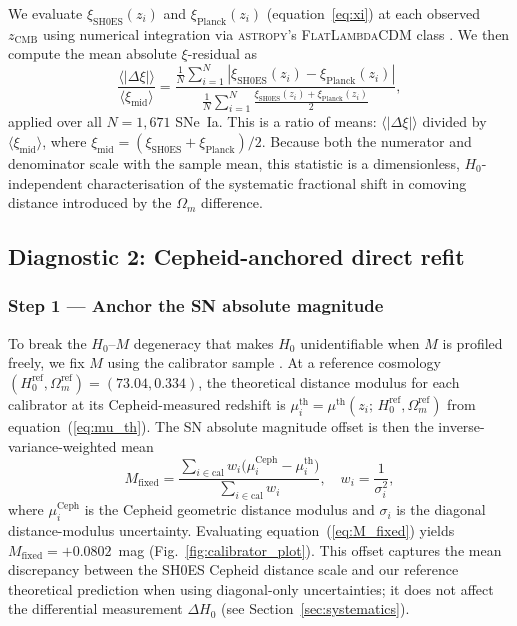 \documentclass[fleqn,usenatbib,useAMS]{mnras}
\begin{document}
We evaluate $\xi_\mathrm{SH0ES}(z_i)$ and $\xi_\mathrm{Planck}(z_i)$
(equation~\ref{eq:xi}) at each observed $z_\mathrm{CMB}$ using numerical integration via
\textsc{astropy}'s \textsc{FlatLambdaCDM} class
\citep{astropy2013,astropy2018,astropy2022}.
We then compute the mean absolute $\xi$-residual as
\begin{equation}
  \frac{\langle|\Delta\xi|\rangle}{\langle\xi_\mathrm{mid}\rangle}
    = \frac{\displaystyle
        \frac{1}{N}\sum_{i=1}^N
            |\xi_\mathrm{SH0ES}(z_i) - \xi_\mathrm{Planck}(z_i)|}%
           {\displaystyle
        \frac{1}{N}\sum_{i=1}^N
            \frac{\xi_\mathrm{SH0ES}(z_i)+\xi_\mathrm{Planck}(z_i)}{2}},
  \label{eq:xi_stat}
\end{equation}
applied over all $N = 1{,}671$ SNe~Ia.
This is a ratio of means: $\langle|\Delta\xi|\rangle$ divided by
$\langle\xi_\mathrm{mid}\rangle$, where
$\xi_\mathrm{mid} = (\xi_\mathrm{SH0ES}+\xi_\mathrm{Planck})/2$.
Because both the numerator and denominator scale with the sample
mean, this statistic is a dimensionless, $H_0$-independent
characterisation of the systematic fractional shift in comoving
distance introduced by the $\Omega_m$ difference.

\subsection{Diagnostic 2: Cepheid-anchored direct refit}
\label{sec:method_refit}

\subsubsection{Step 1 — Anchor the SN absolute magnitude}

To break the $H_0$--$M$ degeneracy that makes $H_0$ unidentifiable
when $M$ is profiled freely, we fix $M$ using the calibrator sample
\citep{camarena2021,cardona2017}.
At a reference cosmology
$(H_0^\mathrm{ref}, \Omega_m^\mathrm{ref}) = (73.04, 0.334)$,
the theoretical distance modulus for each calibrator
at its Cepheid-measured redshift is
$\mu_i^\mathrm{th} = \mu^\mathrm{th}(z_i;\,H_0^\mathrm{ref},
\Omega_m^\mathrm{ref})$ from equation~(\ref{eq:mu_th}).
The SN absolute magnitude offset is then the
inverse-variance-weighted mean
\begin{equation}
  M_\mathrm{fixed}
    = \frac{\displaystyle\sum_{i\in\mathrm{cal}} w_i
            \bigl(\mu_i^\mathrm{Ceph} - \mu_i^\mathrm{th}\bigr)}
           {\displaystyle\sum_{i\in\mathrm{cal}} w_i},
  \quad w_i = \frac{1}{\sigma_i^2},
  \label{eq:M_fixed}
\end{equation}
where $\mu_i^\mathrm{Ceph}$ is the Cepheid geometric distance modulus
and $\sigma_i$ is the diagonal distance-modulus uncertainty.
Evaluating equation~(\ref{eq:M_fixed}) yields $M_\mathrm{fixed} = +0.0802$~mag (Fig.~\ref{fig:calibrator_plot}).
This offset captures the mean discrepancy between the SH0ES
Cepheid distance scale and our reference theoretical prediction
when using diagonal-only uncertainties; it does not affect the
differential measurement $\Delta H_0$ (see
Section~\ref{sec:systematics}).
\end{document}
